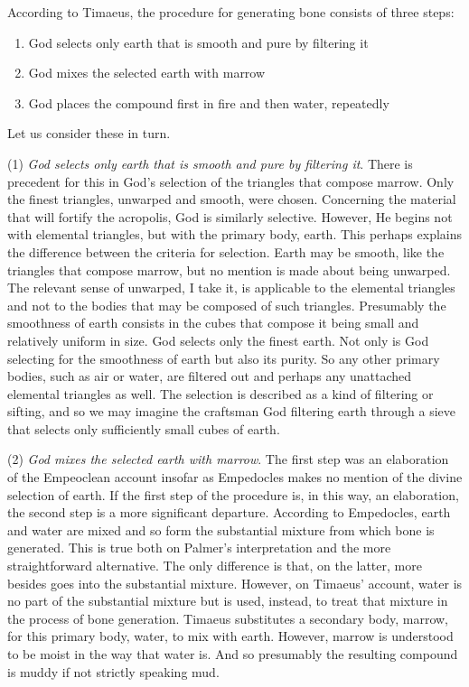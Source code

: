 According to Timaeus, the procedure for generating bone consists of three steps:
\begin{enumerate}[(1)]
	\item God selects only earth that is smooth and pure by filtering it
	\item God mixes the selected earth with marrow
	\item God places the compound first in fire and then water, repeatedly
\end{enumerate}
Let us consider these in turn.

(1) \emph{God selects only earth that is smooth and pure by filtering it}. There is precedent for this in God's selection of the triangles that compose marrow. Only the finest triangles, unwarped and smooth, were chosen. Concerning the material that will fortify the acropolis, God is similarly selective. However, He begins not with elemental triangles, but with the primary body, earth. This perhaps explains the difference between the criteria for selection. Earth may be smooth, like the triangles that compose marrow, but no mention is made about being unwarped. The relevant sense of unwarped, I take it, is applicable to the elemental triangles and not to the bodies that may be composed of such triangles. Presumably the smoothness of earth consists in the cubes that compose it being small and relatively uniform in size. God selects only the finest earth. Not only is God selecting for the smoothness of earth but also its purity. So any other primary bodies, such as air or water, are filtered out and perhaps any unattached elemental triangles as well. The selection is described as a kind of filtering or sifting, and so we may imagine the craftsman God filtering earth through a sieve that selects only sufficiently small cubes of earth.

(2) \emph{God mixes the selected earth with marrow}. The first step was an elaboration of the Empeoclean account insofar as Empedocles makes no mention of the divine selection of earth. If the first step of the procedure is, in this way, an elaboration, the second step is a more significant departure. According to Empedocles, earth and water are mixed and so form the substantial mixture from which bone is generated. This is true both on Palmer's \citeyearpar{Palmer:2009qf} interpretation and the more straightforward alternative. The only difference is that, on the latter, more besides goes into the substantial mixture. However, on Timaeus' account, water is no part of the substantial mixture but is used, instead, to treat that mixture in the process of bone generation. Timaeus substitutes a secondary body, marrow, for this primary body, water, to mix with earth. However, marrow is understood to be moist in the way that water is. And so presumably the resulting compound is muddy if not strictly speaking mud.

